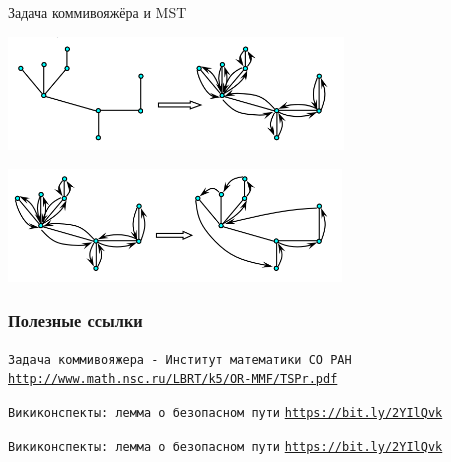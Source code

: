 \documentclass[10pt]{beamer}
\begin{document}
\begin{frame}[fragile]{Задача коммивояжёра и MST}
\begin{center}
\includegraphics[height=3cm]{Term_2/Source/images/kom1.png}
\end{center}
\begin{center}
\includegraphics[height=3cm]{Term_2/Source/images/kom2.png}
\end{center}
\end{frame}

\appendix

\begin{frame}[allowframebreaks]
  \frametitle<presentation>{Полезные ссылки}
    
  \begin{thebibliography}{10}
{
  \beamertemplatebookbibitems
  
 \texttt{Задача коммивояжера - Институт математики СО РАН}
  \newblock \href{http://www.math.nsc.ru/LBRT/k5/OR-MMF/TSPr.pdf}{\texttt{http://www.math.nsc.ru/LBRT/k5/OR-MMF/TSPr.pdf}}
    
  \texttt{Викиконспекты: лемма о безопасном пути}
  \newblock \href{https://bit.ly/2YIlQvk}{\texttt{https://bit.ly/2YIlQvk}}
  
  \texttt{Викиконспекты: лемма о безопасном пути}
  \newblock \href{https://bit.ly/2YIlQvk}{\texttt{https://bit.ly/2YIlQvk}}
 
}
  \end{thebibliography}
  \end{frame}
\end{document}
